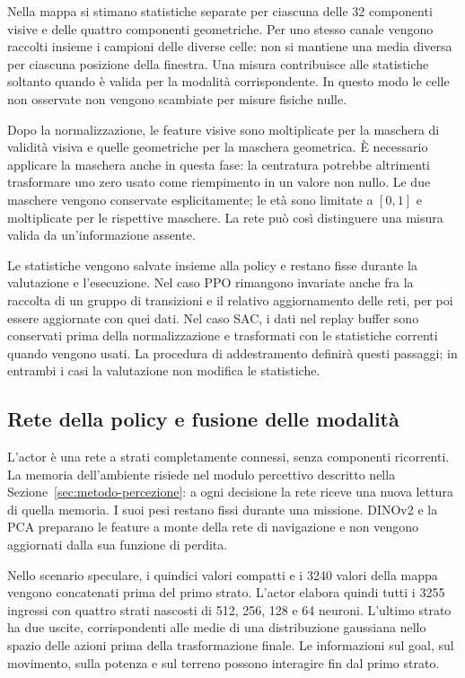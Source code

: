 Nella mappa si stimano statistiche separate per ciascuna delle 32 componenti visive e delle quattro componenti geometriche. Per uno stesso canale vengono raccolti insieme i campioni delle diverse celle: non si mantiene una media diversa per ciascuna posizione della finestra. Una misura contribuisce alle statistiche soltanto quando è valida per la modalità corrispondente. In questo modo le celle non osservate non vengono scambiate per misure fisiche nulle.

Dopo la normalizzazione, le feature visive sono moltiplicate per la maschera di validità visiva e quelle geometriche per la maschera geometrica. È necessario applicare la maschera anche in questa fase: la centratura potrebbe altrimenti trasformare uno zero usato come riempimento in un valore non nullo. Le due maschere vengono conservate esplicitamente; le età sono limitate a $[0,1]$ e moltiplicate per le rispettive maschere. La rete può così distinguere una misura valida da un'informazione assente.

Le statistiche vengono salvate insieme alla policy e restano fisse durante la valutazione e l'esecuzione. Nel caso PPO rimangono invariate anche fra la raccolta di un gruppo di transizioni e il relativo aggiornamento delle reti, per poi essere aggiornate con quei dati. Nel caso SAC, i dati nel replay buffer sono conservati prima della normalizzazione e trasformati con le statistiche correnti quando vengono usati. La procedura di addestramento definirà questi passaggi; in entrambi i casi la valutazione non modifica le statistiche.

\subsection{Rete della policy e fusione delle modalità}

L'actor è una rete a strati completamente connessi, senza componenti ricorrenti. La memoria dell'ambiente risiede nel modulo percettivo descritto nella Sezione~\ref{sec:metodo-percezione}: a ogni decisione la rete riceve una nuova lettura di quella memoria. I suoi pesi restano fissi durante una missione. DINOv2 e la PCA preparano le feature a monte della rete di navigazione e non vengono aggiornati dalla sua funzione di perdita.

Nello scenario speculare, i quindici valori compatti e i 3240 valori della mappa vengono concatenati prima del primo strato. L'actor elabora quindi tutti i 3255 ingressi con quattro strati nascosti di 512, 256, 128 e 64 neuroni. L'ultimo strato ha due uscite, corrispondenti alle medie di una distribuzione gaussiana nello spazio delle azioni prima della trasformazione finale. Le informazioni sul goal, sul movimento, sulla potenza e sul terreno possono interagire fin dal primo strato.

